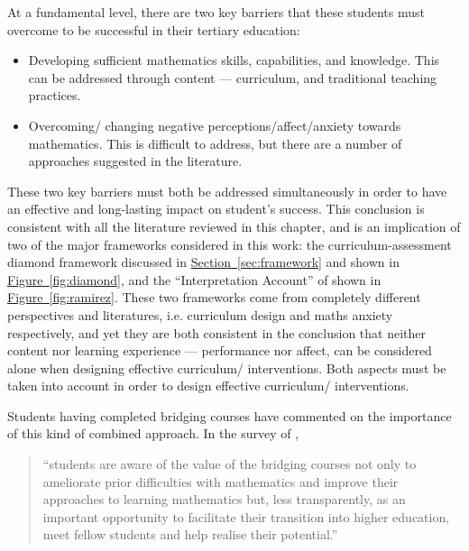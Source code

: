 \documentclass[twoside,12pt,a4paper]{report}
\newcommand{\refsec}[1]{\hyperref[sec:#1]{Section~\ref{sec:#1}}}
\newcommand{\reffig}[1]{\hyperref[fig:#1]{Figure~\ref{fig:#1}}}
\begin{document}
At a fundamental level, there are two key barriers that these students must overcome to be successful in their tertiary education:
\begin{itemize}
	\item Developing sufficient mathematics skills, capabilities, and knowledge. This can be addressed through content --- curriculum, and traditional teaching practices. 
	\item Overcoming/ changing negative perceptions/affect/anxiety towards mathematics. This is difficult to address, but there are a number of approaches suggested in the literature. 
\end{itemize}
These two key barriers must both be addressed simultaneously in order to have an effective and long-lasting impact on student's success. This conclusion is consistent with all the literature reviewed in this chapter, and is an implication of two of the major frameworks considered in this work: the curriculum-assessment diamond framework discussed in \refsec{framework} and shown in \reffig{diamond}, and the ``Interpretation Account'' of  shown in \reffig{ramirez}. These two frameworks come from completely different perspectives and literatures, i.e. curriculum design and maths anxiety respectively, and yet they are both consistent in the conclusion that neither content nor learning experience --- performance nor affect, can be considered alone when designing effective curriculum/ interventions. Both aspects must be taken into account in order to design effective curriculum/ interventions.

Students having completed bridging courses have commented on the importance of this kind of combined approach. In the survey of , 
\begin{quote}
``students are aware of the value of the
bridging courses not only to ameliorate prior difficulties with mathematics and improve their approaches to learning mathematics but, less transparently, as an important opportunity to facilitate their transition into
higher education, meet fellow students and help realise their potential.''
\end{quote}
\end{document}
